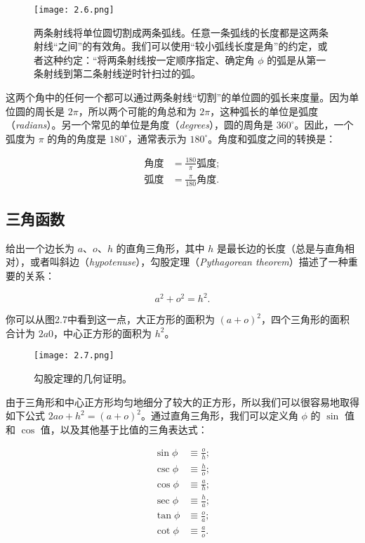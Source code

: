 \documentclass[lang=cn,12pt]{elegantbook}
\begin{document}
\begin{figure}[htbp]
  \centering
  \texttt{[image: 2.6.png]}
  \caption{两条射线将单位圆切割成两条弧线。任意一条弧线的长度都是这两条射线“之间”的有效角。我们可以使用“较小弧线长度是角”的约定，或者这种约定：“将两条射线按一定顺序指定、确定角 $\phi$ 的弧是从第一条射线到第二条射线逆时针扫过的弧。}
\end{figure}

这两个角中的任何一个都可以通过两条射线“切割”的单位圆的弧长来度量。因为单位圆的周长是 $2\pi$，所以两个可能的角总和为 $2\pi$，这种弧长的单位是弧度（\textit{radians}）。另一个常见的单位是角度（\textit{degrees}），圆的周角是 $360^\circ$。因此，一个弧度为 $\pi$ 的角的角度是 $180^\circ$，通常表示为 $180^\circ$。角度和弧度之间的转换是：

$$
  \begin{aligned}
    \text{角度} & =\frac{180}{\pi} \text{弧度}; \\
    \text{弧度} & =\frac{\pi}{180} \text{角度}.
  \end{aligned}
$$

\subsection{三角函数}

给出一个边长为 $a$、$o$、$h$ 的直角三角形，其中 $h$ 是最长边的长度（总是与直角相对），或者叫斜边（\textit{hypotenuse}），勾股定理（\textit{Pythagorean theorem}）描述了一种重要的关系：

$$
  a^2+o^2=h^2.
$$

你可以从图2.7中看到这一点，大正方形的面积为 $(a+o)^2$，四个三角形的面积合计为 $2a0$，中心正方形的面积为 $h^2$。


\begin{figure}[htbp]
  \centering
  \texttt{[image: 2.7.png]}
  \caption{勾股定理的几何证明。}
\end{figure}

由于三角形和中心正方形均匀地细分了较大的正方形，所以我们可以很容易地取得如下公式 $2ao+h^2=(a+o)^2$。通过直角三角形，我们可以定义角 $\phi$ 的 $\sin$ 值和 $\cos$ 值，以及其他基于比值的三角表达式：

$$
  \begin{aligned}
    \sin \phi & \equiv \frac{o}{h}; \\
    \csc \phi & \equiv \frac{h}{o}; \\
    \cos \phi & \equiv \frac{a}{h}; \\
    \sec \phi & \equiv \frac{h}{a}; \\
    \tan \phi & \equiv \frac{o}{a}; \\
    \cot \phi & \equiv \frac{a}{o}.
  \end{aligned}
$$
\end{document}
